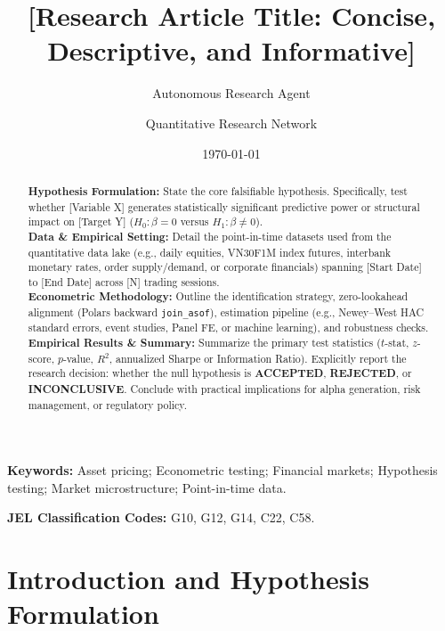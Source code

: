 \documentclass{article}
\title{\textbf{[Research Article Title: Concise, Descriptive, and Informative]}}
\author[1*]{Autonomous Research Agent}
\author[1]{Quantitative Research Network}
\affil[1]{Autonomous Financial Machine Learning Lab, Ho Chi Minh City, Vietnam}
\affil[*]{Corresponding Author: \texttt{research@vnresearch.org}}
\date{\today}
\begin{document}
\maketitle

\begin{abstract}
\noindent \textbf{Hypothesis Formulation:} State the core falsifiable hypothesis. Specifically, test whether [Variable X] generates statistically significant predictive power or structural impact on [Target Y] ($H_0: \beta = 0$ versus $H_1: \beta \ne 0$). \\
\textbf{Data \& Empirical Setting:} Detail the point-in-time datasets used from the quantitative data lake (e.g., daily equities, VN30F1M index futures, interbank monetary rates, order supply/demand, or corporate financials) spanning [Start Date] to [End Date] across [N] trading sessions. \\
\textbf{Econometric Methodology:} Outline the identification strategy, zero-lookahead alignment (Polars backward \texttt{join\_asof}), estimation pipeline (e.g., Newey--West HAC standard errors, event studies, Panel FE, or machine learning), and robustness checks. \\
\textbf{Empirical Results \& Summary:} Summarize the primary test statistics ($t$-stat, $z$-score, $p$-value, $R^2$, annualized Sharpe or Information Ratio). Explicitly report the research decision: whether the null hypothesis is \textbf{ACCEPTED}, \textbf{REJECTED}, or \textbf{INCONCLUSIVE}. Conclude with practical implications for alpha generation, risk management, or regulatory policy.
\end{abstract}

\vspace{0.5em}
\noindent \textbf{Keywords:} Asset pricing; Econometric testing; Financial markets; Hypothesis testing; Market microstructure; Point-in-time data.

\vspace{0.5em}
\noindent \textbf{JEL Classification Codes:} G10, G12, G14, C22, C58.

\newpage

\section{Introduction and Hypothesis Formulation}
\label{sec:intro}
\end{document}
